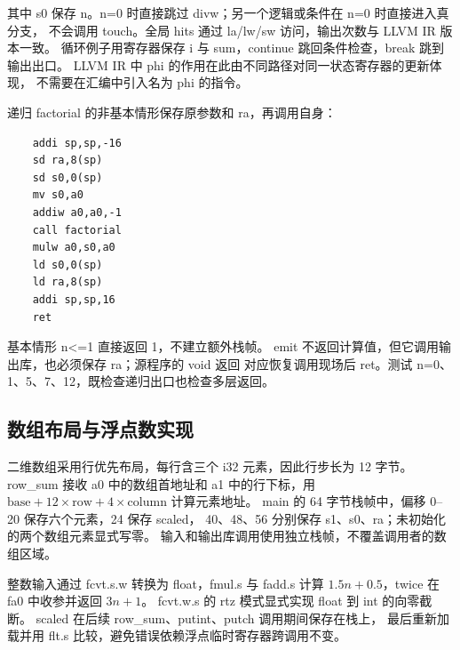 \documentclass[UTF8,a4paper,11pt]{ctexart}
\begin{document}
其中 s0 保存 n。n=0 时直接跳过 divw；另一个逻辑或条件在 n=0 时直接进入真分支，
不会调用 touch。全局 hits 通过 la/lw/sw 访问，输出次数与 LLVM IR 版本一致。
循环例子用寄存器保存 i 与 sum，continue 跳回条件检查，break 跳到输出出口。
LLVM IR 中 phi 的作用在此由不同路径对同一状态寄存器的更新体现，
不需要在汇编中引入名为 phi 的指令。

递归 factorial 的非基本情形保存原参数和 ra，再调用自身：

\par\vspace{0.7\baselineskip}\noindent\begin{minipage}[t]{\linewidth}
\begin{lstlisting}
    addi sp,sp,-16
    sd ra,8(sp)
    sd s0,0(sp)
    mv s0,a0
    addiw a0,a0,-1
    call factorial
    mulw a0,s0,a0
    ld s0,0(sp)
    ld ra,8(sp)
    addi sp,sp,16
    ret
\end{lstlisting}
\end{minipage}\par\vspace{0.5\baselineskip}

基本情形 n<=1 直接返回 1，不建立额外栈帧。
emit 不返回计算值，但它调用输出库，也必须保存 ra；源程序的 void 返回
对应恢复调用现场后 ret。测试 n=0、1、5、7、12，既检查递归出口也检查多层返回。

\subsection{数组布局与浮点数实现}
二维数组采用行优先布局，每行含三个 i32 元素，因此行步长为 12 字节。
row\_sum 接收 a0 中的数组首地址和 a1 中的行下标，用
$\mathrm{base}+12\times\mathrm{row}+4\times\mathrm{column}$ 计算元素地址。
main 的 64 字节栈帧中，偏移 0--20 保存六个元素，24 保存 scaled，
40、48、56 分别保存 s1、s0、ra；未初始化的两个数组元素显式写零。
输入和输出库调用使用独立栈帧，不覆盖调用者的数组区域。

整数输入通过 fcvt.s.w 转换为 float，fmul.s 与 fadd.s 计算
$1.5n+0.5$，twice 在 fa0 中收参并返回 $3n+1$。
fcvt.w.s 的 rtz 模式显式实现 float 到 int 的向零截断。
scaled 在后续 row\_sum、putint、putch 调用期间保存在栈上，
最后重新加载并用 flt.s 比较，避免错误依赖浮点临时寄存器跨调用不变。
\end{document}
